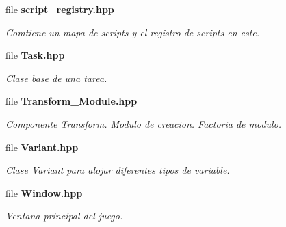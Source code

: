 \begin{DoxyCompactItemize}
file \textbf{ script\+\_\+registry.\+hpp}
\begin{DoxyCompactList}\small\item\em Comtiene un mapa de scripts y el registro de scripts en este. \end{DoxyCompactList}\item 
file \textbf{ Task.\+hpp}
\begin{DoxyCompactList}\small\item\em Clase base de una tarea. \end{DoxyCompactList}\item 
file \textbf{ Transform\+\_\+\+Module.\+hpp}
\begin{DoxyCompactList}\small\item\em Componente Transform. Modulo de creacion. Factoria de modulo. \end{DoxyCompactList}\item 
file \textbf{ Variant.\+hpp}
\begin{DoxyCompactList}\small\item\em Clase Variant para alojar diferentes tipos de variable. \end{DoxyCompactList}\item 
file \textbf{ Window.\+hpp}
\begin{DoxyCompactList}\small\item\em Ventana principal del juego. \end{DoxyCompactList}\end{DoxyCompactItemize}
